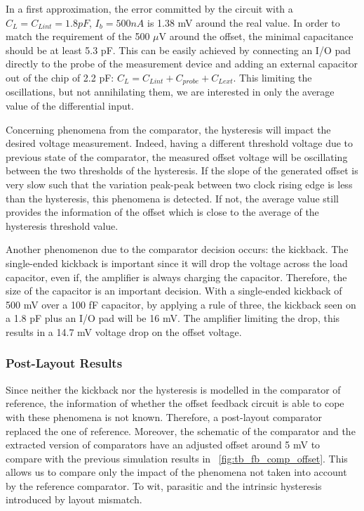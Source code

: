 In a first approximation, the error committed by the circuit with a $C_L = C_{Lint} = 1.8 pF$, $I_b = 500 nA$ is 1.38 mV around the real value. In order to match the requirement of the 500 $\mu$V around the offset, the minimal capacitance should be at least 5.3 pF. This can be easily achieved by connecting an I/O pad directly to the probe of the measurement device and adding an external capacitor out of the chip of 2.2 pF: $C_L = C_{Lint} + C_{probe} + C_{Lext}$. This limiting the oscillations, but not annihilating them, we are interested in only the average value of the differential input.

Concerning phenomena from the comparator, the hysteresis will impact the desired voltage measurement. Indeed, having a different threshold voltage due to previous state of the comparator, the measured offset voltage will be oscillating between the two thresholds of the hysteresis. 
If the slope of the generated offset is very slow such that the variation peak-peak between two clock rising edge is less than the hysteresis, this phenomena is detected. If not, the average value still provides the information of the offset which is close to the average of the hysteresis threshold value.

Another phenomenon due to the comparator decision occurs: the kickback. The single-ended kickback is important since it will drop the voltage across the load capacitor, even if, the amplifier is always charging the capacitor. Therefore, the size of the capacitor is an important decision.
With a single-ended kickback of 500 mV over a 100 fF capacitor, by applying a rule of three, the kickback seen on a 1.8 pF plus an I/O pad will be 16 mV. The amplifier limiting the drop, this results in a 14.7 mV voltage drop on the offset voltage.


\subsubsection{Post-Layout Results}
Since neither the kickback nor the hysteresis is modelled in the comparator of reference, the information of whether the offset feedback circuit is able to cope with these phenomena is not known. Therefore, a post-layout comparator replaced the one of reference. Moreover, the schematic of the comparator and the extracted version of comparators have an adjusted offset around 5 mV to compare with the previous simulation results in \figurename~\ref{fig:tb_fb_comp_offset}. This allows us to compare only the impact of the phenomena not taken into account by the reference comparator. To wit, parasitic and the intrinsic hysteresis introduced by layout mismatch.

